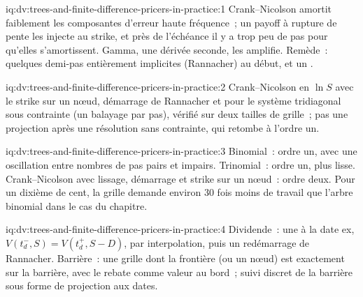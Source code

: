 \begin{solution}{iq:dv:trees-and-finite-difference-pricers-in-practice:1}
Crank--Nicolson amortit faiblement les composantes d'erreur haute fréquence~; un payoff à rupture de pente les injecte au strike, et près de l'échéance il y a trop peu de
pas pour qu'elles s'amortissent. Gamma, une dérivée seconde, les amplifie. Remède~: quelques demi-pas entièrement implicites (Rannacher) au début, et un
.
\end{solution}

\begin{solution}{iq:dv:trees-and-finite-difference-pricers-in-practice:2}
Crank--Nicolson en $\ln S$ avec le strike sur un nœud, démarrage de Rannacher et  pour le système tridiagonal sous contrainte (un
balayage par pas), vérifié sur deux tailles de grille~; pas une projection après une résolution sans contrainte, qui retombe à l'ordre un.
\end{solution}

\begin{solution}{iq:dv:trees-and-finite-difference-pricers-in-practice:3}
Binomial~: ordre un, avec une oscillation entre nombres de pas pairs et impairs. Trinomial~: ordre un, plus lisse. Crank--Nicolson avec lissage, démarrage et
strike sur un nœud~: ordre deux. Pour un dixième de cent, la grille demande environ 30 fois moins de travail que l'arbre binomial dans le cas du chapitre.
\end{solution}

\begin{solution}{iq:dv:trees-and-finite-difference-pricers-in-practice:4}
Dividende~: une  à la date ex, $V(t_d^-,S)=V(t_d^+,S-D)$, par interpolation, puis un redémarrage de Rannacher. Barrière~: une grille dont la frontière (ou un nœud) est
exactement sur la barrière, avec le rebate comme valeur au bord~; suivi discret de la barrière sous forme de projection aux dates.
\end{solution}

